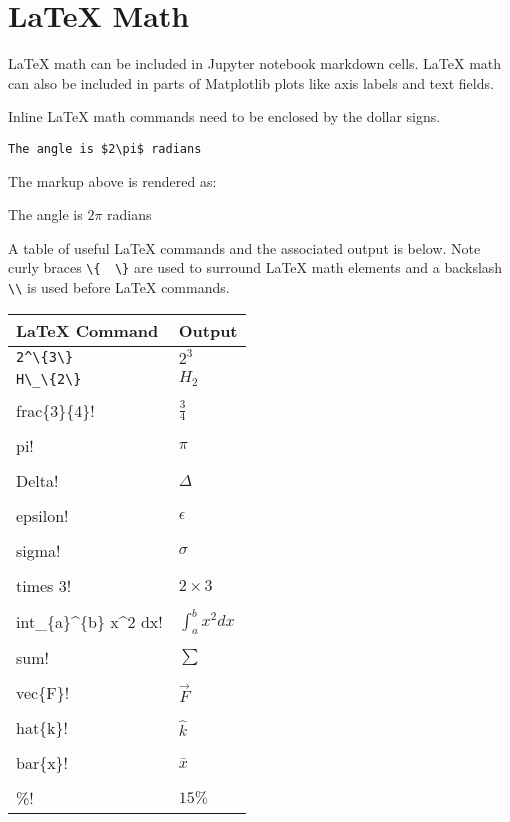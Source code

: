 \documentclass{book}
\newcommand{\passthrough}[1]{#1}
\begin{document}
    
        \hypertarget{latex-math}{%
\section{LaTeX Math}\label{latex-math}}
    




    
        LaTeX math can be included in Jupyter notebook markdown cells. LaTeX
math can also be included in parts of Matplotlib plots like axis labels
and text fields.

Inline LaTeX math commands need to be enclosed by the dollar signs.

\begin{lstlisting}
The angle is $2\pi$ radians
\end{lstlisting}

The markup above is rendered as:

The angle is \(2\pi\) radians

A table of useful LaTeX commands and the associated output is below.
Note curly braces \passthrough{\lstinline!\{  \}!} are used to surround
LaTeX math elements and a backslash \passthrough{\lstinline!\\!} is used
before LaTeX commands.

\begin{longtable}[]{@{}ll@{}}
\toprule
LaTeX Command & Output\tabularnewline
\midrule
\endhead
\passthrough{\lstinline!2^\{3\}!} & \(2^{3}\)\tabularnewline
\passthrough{\lstinline!H\_\{2\}!} & \(H_{2}\)\tabularnewline
\passthrough{\lstinline!\\frac\{3\}\{4\}!} &
\(\frac{3}{4}\)\tabularnewline
\passthrough{\lstinline!\\pi!} & \(\pi\)\tabularnewline
\passthrough{\lstinline!\\Delta!} & \(\Delta\)\tabularnewline
\passthrough{\lstinline!\\epsilon!} & \(\epsilon\)\tabularnewline
\passthrough{\lstinline!\\sigma!} & \(\sigma\)\tabularnewline
\passthrough{\lstinline!2 \\times 3!} & \(2 \times 3\)\tabularnewline
\passthrough{\lstinline!\\int\_\{a\}^\{b\} x^2 dx!} &
\(\int_{a}^{b} x^2 dx\)\tabularnewline
\passthrough{\lstinline!\\sum!} & \(\sum\)\tabularnewline
\passthrough{\lstinline!\\vec\{F\}!} & \(\vec{F}\)\tabularnewline
\passthrough{\lstinline!\\hat\{k\}!} & \(\hat{k}\)\tabularnewline
\passthrough{\lstinline!\\bar\{x\}!} & \(\bar{x}\)\tabularnewline
\passthrough{\lstinline!15 \\\%!} & \(15 \%\)\tabularnewline
\bottomrule
\end{longtable}
    
\end{document}
